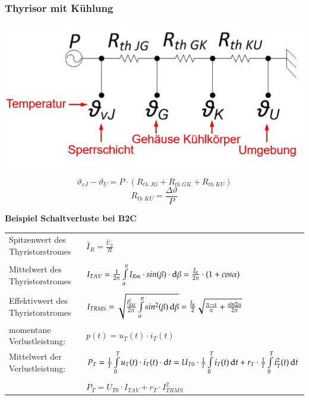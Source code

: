 \begin{multicols}{3}
\begin{minipage}{\linewidth}
		\subsubsection{Thyrisor mit Kühlung}
		\includegraphics[width=\linewidth]{images/thyrMK}
		\[ \vartheta_{vJ}-\vartheta_U=P \cdot (R_{th\; JG}+R_{th\; GK}+R_{th\; KU}) \]	
        \[ R_{th \; KU}=\dfrac{\Delta \vartheta}{P} \]
	\end{minipage}
\end{multicols}

\vspace{-1.5cm}
\textbf{Beispiel Schaltverluste bei B2C}\newline
\begin{tabular}{ll}
    Spitzenwert des Thyristorstromes&
    $\hat{I}_{R} = \frac{\hat{U}_{2}}{R}$\\
    \\
    
    Mittelwert des Thyristorstromes &
    $I_{T AV} = \frac{1}{2\pi}\int\limits_{\alpha}^{\pi}I_{Rm} \cdot sin(\beta) \cdot \mathop{}\!\mathrm{d}\beta= \frac{\hat{I}_{R}}{2\pi} \cdot (1+cos\alpha)$\\
    \\

    Effektivwert des Thyristorstromes &
    $I_{T RMS} = \sqrt{\frac{I_{RM}^2}{2\pi}\int\limits_{\alpha}^{\pi}sin^2(\beta)\mathop{}\!\mathrm{d}\beta}= \frac{\hat{I}_{R}}{2}\sqrt{\frac{\pi - \alpha}{\pi}+\frac{sin2\alpha}{2\pi}}$\\

    momentane Verlustleistung:&
    $p(t) = u_{T}(t) \cdot i_{T}(t)$\\
    Mittelwert der Verlustleistung: &
    $P_{T} = \frac{1}{T}\int\limits_{0}^{T}u_{T}(t) \cdot i_{T}(t) \cdot \mathop{}\!\mathrm{d} t = U_{T0} \cdot \frac{1}{T}\int\limits_{0}^{T}i_{T}(t)\mathop{}\!\mathrm{d} t+r_{T} \cdot \frac{1}{T}\int\limits_{0}^{T}i_{T}^2(t)\mathop{}\!\mathrm{d} t$\\
    \\
    & $P_{T} = U_{T0} \cdot I_{T AV} + r_{T} \cdot I_{T RMS}^2$\\
\end{tabular}

